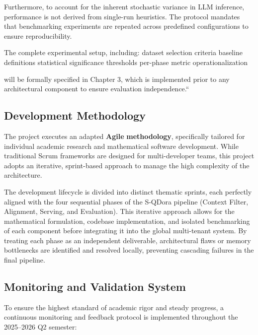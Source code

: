 Furthermore, to account for the inherent stochastic variance in LLM inference, performance is not derived from single-run heuristics. The protocol mandates that benchmarking experiments are repeated across predefined configurations to ensure reproducibility.

The complete experimental setup, including: 
dataset selection criteria
baseline definitions
statistical significance thresholds
per-phase metric operationalization 

will be formally specified in Chapter 3, which is implemented prior to any architectural component to ensure evaluation independence.``

\subsection{Development Methodology}
\label{subsec:development-methodology}

The project executes an adapted \textbf{Agile}\cite{agile} \textbf{methodology}, specifically tailored for individual academic research and mathematical software development. While traditional Scrum frameworks are designed for multi-developer teams, this project adopts an iterative, sprint-based approach to manage the high complexity of the architecture. 

The development lifecycle is divided into distinct thematic sprints, each perfectly aligned with the four sequential phases of the S-QDora\cite{qlora2023, dora2024, s-lora2024} pipeline (Context Filter, Alignment, Serving, and Evaluation). This iterative approach allows for the mathematical formulation, codebase implementation, and isolated benchmarking of each component before integrating it into the global multi-tenant system. By treating each phase as an independent deliverable, architectural flaws or memory bottlenecks are identified and resolved locally, preventing cascading failures in the final pipeline.

\subsection{Monitoring and Validation System}
\label{subsec:monitoring-system}

To ensure the highest standard of academic rigor and steady progress, a continuous monitoring and feedback protocol is implemented throughout the 2025--2026 Q2 semester:

